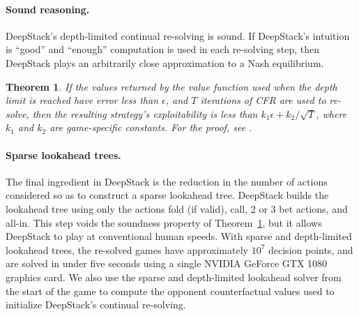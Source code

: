 \documentclass[12pt]{article}
\newtheorem{theorem}{Theorem}
\begin{document}
\paragraph*{Sound reasoning.}
DeepStack's depth-limited continual re-solving is sound.  If DeepStack's intuition is ``good'' and ``enough'' computation is used in each re-solving step, then DeepStack plays an arbitrarily close approximation to a Nash equilibrium.
%
\begin{theorem}
If the values returned by the value function used when the depth limit is reached have error less than $\epsilon$, and $T$ iterations of CFR are used to re-solve, then the resulting strategy's exploitability is less than $k_1\epsilon + k_2 / \sqrt{T}$, where $k_1$ and $k_2$ are game-specific constants.  For the proof, see \cite{SOM}.
\label{thm}
\end{theorem}

\paragraph*{Sparse lookahead trees.} 
The final ingredient in DeepStack is the reduction in the number of actions considered so as to construct a sparse lookahead tree.
DeepStack builds the lookahead tree using only the actions fold (if valid), 
call, 2 or 3 bet actions, and all-in.  
This step voids the soundness property of Theorem~\ref{thm}, but it allows DeepStack to play at conventional human speeds.
With sparse and depth-limited
lookahead trees, the re-solved games have approximately $10^{7}$ decision points, and are solved 
in under five seconds using a single NVIDIA GeForce GTX 1080 graphics card.  We also use the sparse and depth-limited lookahead solver from the start of the game to compute the opponent counterfactual values used to initialize DeepStack's continual re-solving.
\end{document}
